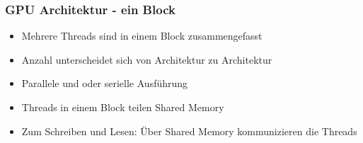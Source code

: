 \documentclass{sikslides}
\begin{document}
\begin{frame}
  \frametitle{GPU Architektur - ein Block}
  \begin{itemize}
  \item Mehrere Threads sind in einem Block zusammengefasst
\bigskip
  \item Anzahl unterscheidet sich von Architektur zu Architektur
\bigskip
  \item Parallele und oder serielle Ausführung
\bigskip
  \item Threads in einem Block teilen Shared Memory
\bigskip
  \item Zum Schreiben und Lesen: Über Shared Memory kommunizieren die Threads 
  \end{itemize}
\end{frame}
\end{document}
